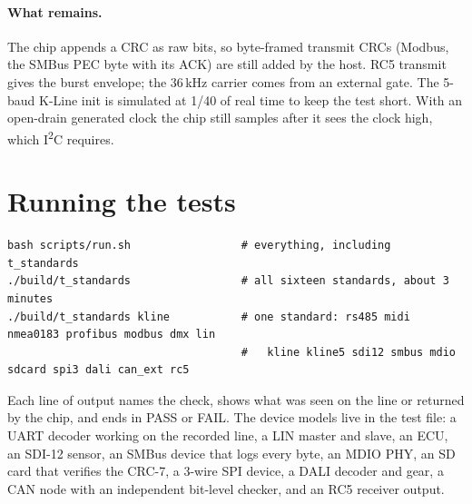 \documentclass[11pt,a4paper]{article}
\begin{document}
\paragraph{What remains.} The chip appends a CRC as raw bits, so byte-framed transmit CRCs (Modbus, the SMBus PEC byte with its ACK) are still added by the host. RC5 transmit gives the burst envelope; the 36\,kHz carrier comes from an external gate. The 5-baud K-Line init is simulated at 1/40 of real time to keep the test short. With an open-drain generated clock the chip still samples after it sees the clock high, which I\textsuperscript{2}C requires.

\section{Running the tests}\label{sec:run}
\begin{lstlisting}
bash scripts/run.sh                 # everything, including t_standards
./build/t_standards                 # all sixteen standards, about 3 minutes
./build/t_standards kline           # one standard: rs485 midi nmea0183 profibus modbus dmx lin
                                    #   kline kline5 sdi12 smbus mdio sdcard spi3 dali can_ext rc5
\end{lstlisting}
Each line of output names the check, shows what was seen on the line or returned by the chip, and ends in PASS or FAIL. The device models live in the test file: a UART decoder working on the recorded line, a LIN master and slave, an ECU, an SDI-12 sensor, an SMBus device that logs every byte, an MDIO PHY, an SD card that verifies the CRC-7, a 3-wire SPI device, a DALI decoder and gear, a CAN node with an independent bit-level checker, and an RC5 receiver output.
\end{document}
